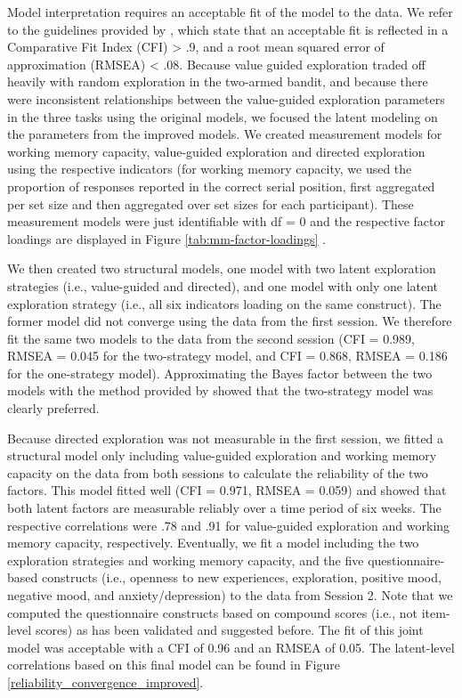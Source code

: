 \documentclass[fleqn,10pt]{wlscirep}
\begin{document}
Model interpretation requires an acceptable fit of the model to the data. We refer to the guidelines provided by \cite{mcdonald_principles_2002}, which state that an acceptable fit is reflected in a Comparative Fit Index (CFI) > .9, and a root mean squared error of approximation (RMSEA) < .08.
Because value guided exploration traded off heavily with random exploration in the two-armed bandit, and because there were inconsistent relationships between the value-guided exploration parameters in the three tasks using the original models, we focused the latent modeling on the parameters from the improved models. We created measurement models for working memory capacity, value-guided exploration and directed exploration using the respective indicators (for working memory capacity, we used the proportion of responses reported in the correct serial position, first aggregated per set size and then aggregated over set sizes for each participant). These measurement models were just identifiable with df = 0 and the respective factor loadings are displayed in Figure \ref{tab:mm-factor-loadings} . 

We then created two structural models, one model with two latent exploration strategies (i.e., value-guided and directed), and one model with only one latent exploration strategy (i.e., all six indicators loading on the same construct). The former model did not converge using the data from the first session.  We therefore fit the same two models to the data from the second session (CFI = 0.989, RMSEA = 0.045 for the two-strategy model, and CFI = 0.868, RMSEA = 0.186 for the one-strategy model). Approximating the Bayes factor between the two models with the method provided by \cite{wagenmakers_practical_2007} showed that the two-strategy model was clearly preferred.

Because directed exploration was not measurable in the first session, we fitted a structural model only including value-guided exploration and working memory capacity on the data from both sessions to calculate the reliability of the two factors. This model fitted well (CFI = 0.971, RMSEA = 0.059) and showed that both latent factors are measurable reliably over a time period of six weeks. The respective correlations were .78 and .91 for value-guided exploration and working memory capacity, respectively.
Eventually, we fit a model including the two exploration strategies and working memory capacity, and the five questionnaire-based constructs (i.e., openness to new experiences, exploration, positive mood, negative mood, and anxiety/depression) to the data from Session 2. Note that we computed the questionnaire constructs based on compound scores (i.e., not item-level scores) as has been validated and suggested before\cite{ree2008distinguishing, kroenke2001phq, kashdan2004curiosity, soto2017short, watson1988development}. The fit of this joint model was acceptable with a CFI of 0.96 and an RMSEA of 0.05. The latent-level correlations based on this final model can be found in Figure \ref{reliability_convergence_improved}.
\end{document}
